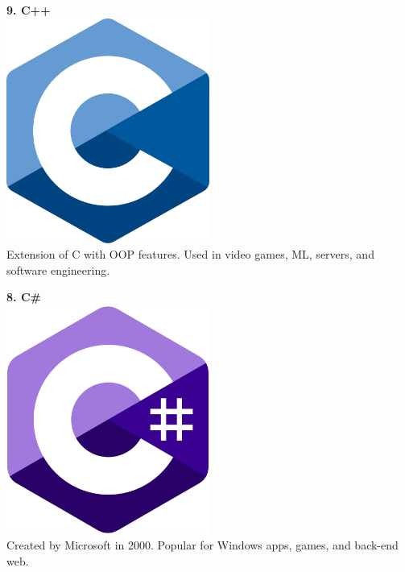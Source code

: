 \documentclass[12pt,a4paper]{article}
\begin{document}
\hrulefill

\textbf{9. C++} \\
\includegraphics[width=0.5\textwidth]{images/clang.jpg} \\
Extension of C with OOP features. Used in video games, ML, servers, and software engineering.

\hrulefill

\textbf{8. C\#} \\
\includegraphics[width=0.5\textwidth]{images/csharp.jpg} \\
Created by Microsoft in 2000. Popular for Windows apps, games, and back-end web.

\hrulefill
\end{document}
